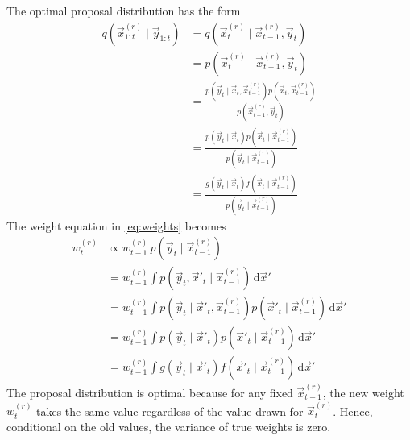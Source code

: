     The optimal proposal distribution has the form
    \begin{align}
        q\left(\vec x_{1:t}^{(r)} \mid \vec y_{1:t}\right)  &= q\left(\vec x_t^{(r)} \mid \vec x_{t - 1}^{(r)}, \vec y_t\right) \\
                                                            &= p\left(\vec x_t^{(r)} \mid \vec x_{t - 1}^{(r)}, \vec y_t\right) \\
                                                            &= \frac{p\left(\vec y_t \mid \vec x_t, \vec x_{t-1}^{(r)}\right) p\left(\vec x_t, \vec x_{t-1}^{(r)}\right)}{p\left(\vec x_{t-1}^{(r)}, \vec y_t\right)} \\
                                                            &= \frac{p\left(\vec y_t \mid \vec x_t\right) p\left(\vec x_t \mid \vec x_{t-1}^{(r)}\right)}{p\left(\vec y_t \mid \vec x_{t-1}^{(r)}\right)} \\
                                                            &= \frac{g\left(\vec y_t \mid \vec x_t\right) f\left(\vec x_t \mid \vec x_{t-1}^{(r)}\right)}{p\left(\vec y_t \mid \vec x_{t-1}^{(r)}\right)}
    \end{align}
    The weight equation in \eqref{eq:weights} becomes
    \begin{align}
        w_t^{(r)}   &\propto w_{t - 1}^{(r)}\, p\left(\vec y_t \mid \vec x_{t-1}^{(r)}\right) \\
                    &= w_{t - 1}^{(r)} \int{p\left(\vec y_t, \vec x'_t \mid \vec x_{t-1}^{(r)}\right) \,\mathrm d\vec x'} \\
                    &= w_{t - 1}^{(r)} \int{p\left(\vec y_t \mid \vec x'_t, \vec x_{t-1}^{(r)}\right) p\left(\vec x'_t \mid \vec x_{t-1}^{(r)}\right) \,\mathrm d\vec x'} \\
                    &= w_{t - 1}^{(r)} \int{p\left(\vec y_t \mid \vec x'_t\right) p\left(\vec x'_t \mid \vec x_{t-1}^{(r)}\right) \,\mathrm d\vec x'} \\
                    &= w_{t - 1}^{(r)} \int{g\left(\vec y_t \mid \vec x'_t\right) f\left(\vec x'_t \mid \vec x_{t-1}^{(r)}\right) \,\mathrm d\vec x'}
    \end{align}
    The proposal distribution is optimal because for any fixed $\vec x_{t-1}^{(r)}$, the new weight $w_t^{(r)}$ takes the same value regardless of the value drawn for $\vec x_t^{(r)}$. Hence, conditional on the old values, the variance of true weights is zero.